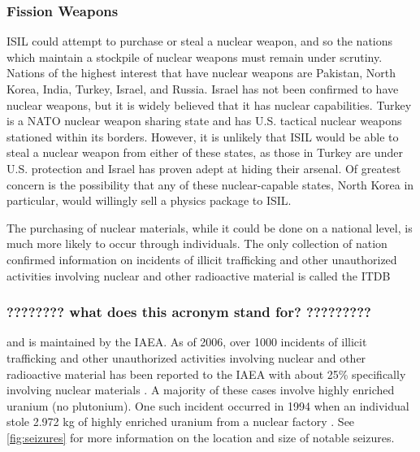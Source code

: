 \documentclass{report}
\begin{document}
\subsubsection{Fission Weapons}

ISIL could attempt to purchase or steal a nuclear weapon, and so the nations which maintain a stockpile of nuclear weapons must remain under scrutiny. Nations of the highest interest that have nuclear weapons are Pakistan, North Korea, India, Turkey, Israel, and Russia. Israel has not been confirmed to have nuclear weapons, but it is widely believed that it has nuclear capabilities. Turkey is a NATO nuclear weapon sharing state and has U.S. tactical nuclear weapons stationed within its borders. However, it is unlikely that ISIL would be able to steal a nuclear weapon from either of these states, as those in Turkey are under U.S. protection and Israel has proven adept at hiding their arsenal. Of greatest concern is the possibility that any of these nuclear-capable states, North Korea in particular, would willingly sell a physics package to ISIL.

The purchasing of nuclear materials, while it could be done on a national level, is much more likely to occur through individuals. The only collection of nation confirmed information on incidents of illicit trafficking and other unauthorized activities involving nuclear and other radioactive material is called the ITDB \subsubsection{???????? what does this acronym stand for?  ?????????} and is maintained by the IAEA. As of 2006, over 1000 incidents of illicit trafficking and other unauthorized activities involving nuclear and other radioactive material has been reported to the IAEA with about 25\% specifically involving nuclear materials \cite{Iaea2007}. A majority of these cases involve highly enriched uranium (no plutonium). One such incident occurred in 1994 when an individual stole 2.972 kg of highly enriched uranium from a nuclear factory \cite{Iaea2007}. See \autoref{fig:seizures} for more information on the location and size of notable seizures. 
\end{document}
